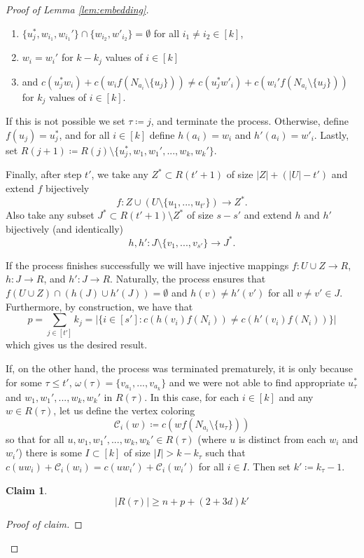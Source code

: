 \documentclass{article}
\newcommand{\cC}{\mathcal{C} }
\newtheorem{claim}[theorem]{Claim}
\theoremstyle{definition}
\newenvironment{subproof}[1][\proofname]{%
  \renewcommand{\qedsymbol}{$\blacksquare$}%
  \begin{proof}[#1]%
}{%
  \end{proof}%
}
\begin{document}
\begin{proof}[Proof of Lemma \ref{lem:embedding}]
\begin{enumerate}
    \begin{enumerate}
        \item $\{u_j^*,w_{i_1},w_{i_1}'\}\cap \{w_{i_2},w'_{i_2}\}=\emptyset$ for all $i_1\neq i_2\in [k]$,
        \item $w_i=w_i'$ for $k-k_j$ values of $i\in [k]$ 
        \item and $c(u^*_jw_i) + c(w_if(N_{a_i}\setminus \{u_j\})) \neq c(u^*_jw'_i)+c(w_i'f(N_{a_i}\setminus \{u_j\}))$ for $k_j$ values of $i\in [k]$.
    \end{enumerate}
    If this is not possible we set $\tau\coloneqq j$, and terminate the process.
    Otherwise, define $f(u_j)=u^*_j$, and for all $i\in [k]$ define $h(a_i)=w_i$ and $h'(a_i)=w'_i$. Lastly, set $R({j+1})\coloneqq R({j})\setminus \{u^*_j,w_1,w_1',...,w_k,w_k'\}.$
\end{enumerate}
Finally, after step $t'$, we take any $Z^*\subset R(t'+1)$ of size $|Z|+(|U|-t')$ and extend $f$ bijectively $$f:Z\cup (U\setminus \{u_1,...,u_{t'}\})\to  Z^*.$$ Also take any subset $J^*\subset R({t'+1})\setminus Z^*$ of size $s-s'$ and extend $h$ and $h'$ bijectively (and identically) $$h,h':J\setminus\{v_1,...,v_{s'}\}\to J^*.$$

If the process finishes successfully we will have injective mappings $f:U\cup Z\to R$, $h:J\to R$, and $h':J\to R$. Naturally, the process ensures that $f(U\cup Z)\cap(h(J)\cup h'(J))=\emptyset$ and $h(v)\neq h'(v')$ for all $v\neq v'\in J$. Furthermore, by construction, we have that $$p= \sum_{j\in[t']} k_j=|\{i\in [s']:c(h(v_i)f(N_{i}))\neq c(h'(v_{i})f(N_{i}))\}|$$ which gives us the desired result.

If, on the other hand, the process was terminated prematurely, it is only because for some $\tau \leq t'$, $\omega(\tau )=\{v_{a_1},...,v_{a_k}\}$ and we were not able to find appropriate $u_{\tau }^*$ and $w_1,w_1',...,w_k,w_k'$ in $R(\tau)$. In this case, for each $i\in [k]$ and any $w\in R(\tau)$, let us define the vertex coloring $$\cC_i(w)\coloneqq c(wf(N_{a_i}\setminus \{u_{\tau }\}))$$ so that for all $u, w_1,w_1',...,w_k,w_k'\in R(\tau)$ (where $u$ is distinct from each $w_i$ and $w_i'$) there is some $I\subset [k]$ of size $|I|>k-k_\tau$ such that $c(uw_i)+\cC_i(w_i)=c(uw_i')+\cC_i(w_i')$ for all $i\in I$. Then set $k'\coloneqq k_{\tau }-1$. 

\begin{claim}$$|R(\tau)|\geq n+ p +(2+3d)k'$$
\end{claim}

\begin{subproof}[Proof of claim]


\end{subproof}
\end{proof}
\end{document}
